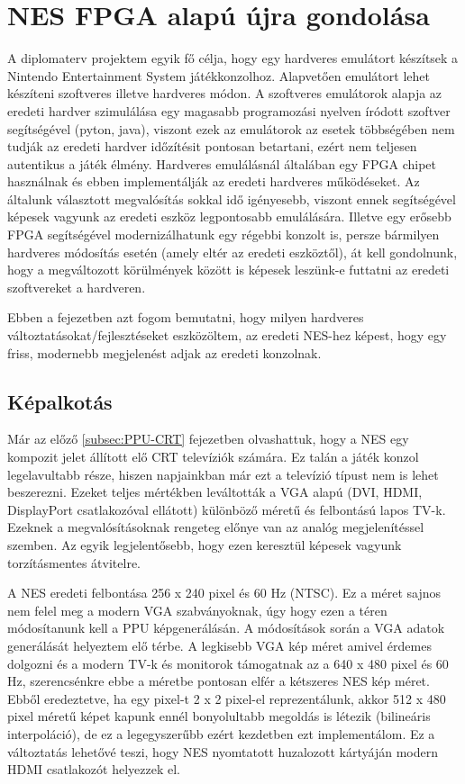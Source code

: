 \chapter{NES FPGA alapú újra gondolása}

A diplomaterv projektem egyik fő célja, hogy egy hardveres emulátort készítsek a Nintendo Entertainment System játékkonzolhoz. Alapvetően emulátort lehet készíteni szoftveres illetve hardveres módon. A szoftveres emulátorok alapja az eredeti hardver szimulálása egy magasabb programozási nyelven íródott szoftver segítségével (pyton, java), viszont ezek az emulátorok az esetek többségében nem tudják az eredeti hardver időzítésit pontosan betartani, ezért nem teljesen autentikus a játék élmény. Hardveres emulálásnál általában egy FPGA chipet használnak és ebben implementálják az eredeti hardveres működéseket. Az általunk választott megvalósítás sokkal idő igényesebb, viszont ennek segítségével képesek vagyunk az eredeti eszköz legpontosabb emulálására. Illetve egy erősebb FPGA segítségével modernizálhatunk egy régebbi konzolt is, persze bármilyen hardveres módosítás esetén (amely eltér az eredeti eszköztől), át kell gondolnunk, hogy a megváltozott körülmények között is képesek leszünk-e futtatni az eredeti szoftvereket a hardveren. 

Ebben a fejezetben azt fogom bemutatni, hogy milyen hardveres változtatásokat/fejlesztéseket eszközöltem, az eredeti NES-hez képest, hogy egy friss, modernebb megjelenést adjak az eredeti konzolnak.

\section{Képalkotás}
\label{sec:picture-creation-ideas}

Már az előző \ref{subsec:PPU-CRT} fejezetben olvashattuk, hogy a NES egy kompozit jelet állított elő CRT televíziók számára. Ez talán a játék konzol legelavultabb része, hiszen napjainkban már ezt a televízió típust nem is lehet beszerezni. Ezeket teljes mértékben leváltották a VGA alapú (DVI, HDMI, DisplayPort csatlakozóval ellátott) különböző méretű és felbontású lapos TV-k. Ezeknek a megvalósításoknak rengeteg előnye van az analóg megjelenítéssel szemben. Az egyik legjelentősebb, hogy ezen keresztül képesek vagyunk torzításmentes átvitelre.

A NES eredeti felbontása 256 x 240 pixel és 60 Hz (NTSC). Ez a  méret sajnos nem felel meg a modern VGA szabványoknak, úgy hogy ezen a téren módosítanunk kell a PPU képgenerálásán. A módosítások során a VGA adatok generálását helyeztem elő térbe. A legkisebb VGA kép méret amivel érdemes dolgozni és a modern TV-k és monitorok támogatnak az a 640 x 480 pixel és 60 Hz, szerencsénkre ebbe a méretbe pontosan elfér a kétszeres NES kép méret. Ebből eredeztetve, ha egy pixel-t 2 x 2 pixel-el reprezentálunk, akkor 512 x 480 pixel méretű képet kapunk ennél bonyolultabb megoldás is létezik (bilineáris interpoláció), de ez a legegyszerűbb ezért kezdetben ezt implementálom. Ez a változtatás lehetővé teszi, hogy NES nyomtatott huzalozott kártyáján modern HDMI csatlakozót helyezzek el. 

